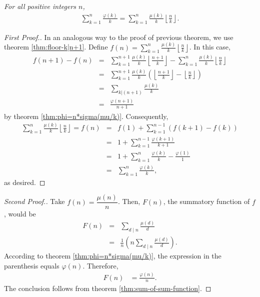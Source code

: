 \documentclass[12pt]{subfile}
\begin{document}
		\begin{theorem}\slshape
			For all positive integers $n$,
				\begin{align*}
					\sum_{k=1}^{n} \frac{\varphi(k)}{k} = \sum_{k=1}^{n} \frac{\mu(k)}{k} \left\lfloor \frac{n}{k} \right\rfloor.
				\end{align*}
		\end{theorem}

		\begin{proof}[First Proof.]
			In an analogous way to the proof of previous theorem, we use theorem \ref{thm:floor-k|n+1}. Define $f(n)= \sum\limits_{k=1}^{n} \frac{\mu(k)}{k} \left\lfloor \frac{n}{k} \right\rfloor$. In this case,
				\begin{eqnarray*}
					f(n+1)-f(n) &=& \sum_{k=1}^{n+1} \frac{\mu(k)}{k} \left\lfloor \frac{n+1}{k} \right\rfloor - \sum_{k=1}^{n} \frac{\mu(k)}{k} \left\lfloor \frac{n}{k} \right\rfloor\\
								&=& \sum_{k=1}^{n+1} \frac{\mu(k)}{k} \left(\left\lfloor \frac{n+1}{k} \right\rfloor - \left\lfloor \frac{n}{k} \right\rfloor\right)\\
								&=& \sum_{k|(n+1)} \frac{\mu(k)}{k}\\
								&=& \frac{\varphi(n+1)}{n+1}
				\end{eqnarray*}
			by theorem \ref{thm:phi=n*sigma(mu/k)}. Consequently,
				\begin{eqnarray*}
					\sum\limits_{k=1}^{n} \frac{\mu(k)}{k} \left\lfloor \frac{n}{k} \right\rfloor = f(n)
						&=& f(1) + \sum_{k=1}^{n-1} \left(f(k+1)-f(k)\right)\\
						&=& 1 + \sum_{k=1}^{n-1} \frac{\varphi(k+1)}{k+1}\\
						&=& 1 + \sum_{k=1}^{n} \frac{\varphi(k)}{k} - \frac{\varphi(1)}{1}\\
						&=& \sum_{k=1}^{n} \frac{\varphi(k)}{k},
				\end{eqnarray*}
			as desired.
		\end{proof}

		\begin{proof}[Second Proof.]
			Take $f(n)= \dfrac{\mu(n)}{n}$. Then, $F(n)$, the summatory function of $f$, would be
				\begin{eqnarray*}
					F(n) &=& \sum_{d\mid n} \frac{\mu(d)}{d} \\
						 &=& \frac{1}{n} \left(n\sum_{d\mid n} \frac{\mu(d)}{d}\right).
				\end{eqnarray*}
			According to theorem \ref{thm:phi=n*sigma(mu/k)}, the expression in the parenthesis equals $\varphi(n)$. Therefore,
				\begin{align*}
					F(n) &= \frac{\varphi(n)}{n}.
				\end{align*}
			The conclusion follows from theorem \ref{thm:sum-of-sum-function}.
		\end{proof}
\end{document}
